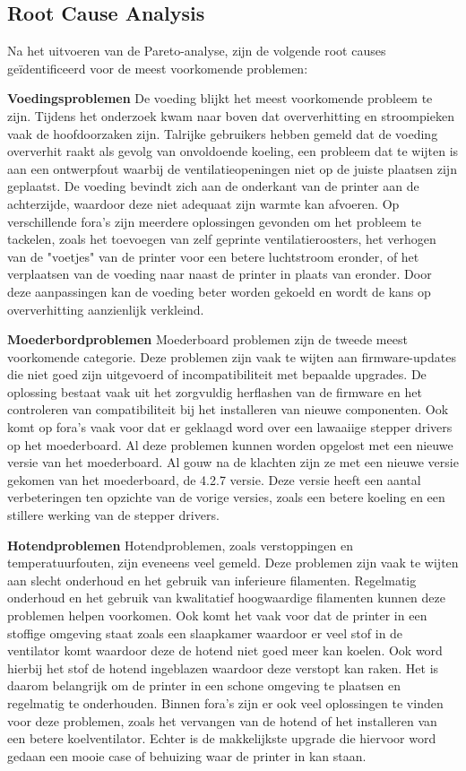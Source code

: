 \documentclass{article}
\begin{document}
\subsection{Root Cause Analysis}
Na het uitvoeren van de Pareto-analyse, zijn de volgende root causes geïdentificeerd voor de meest voorkomende problemen:

\textbf{Voedingsproblemen}
De voeding blijkt het meest voorkomende probleem te zijn. Tijdens het onderzoek kwam naar boven dat oververhitting en stroompieken vaak de hoofdoorzaken zijn. Talrijke gebruikers hebben gemeld dat de voeding oververhit raakt als gevolg van onvoldoende koeling, een probleem dat te wijten is aan een ontwerpfout waarbij de ventilatieopeningen niet op de juiste plaatsen zijn geplaatst. De voeding bevindt zich aan de onderkant van de printer aan de achterzijde, waardoor deze niet adequaat zijn warmte kan afvoeren. Op verschillende fora's zijn meerdere oplossingen gevonden om het probleem te tackelen, zoals het toevoegen van zelf geprinte ventilatieroosters, het verhogen van de "voetjes" van de printer voor een betere luchtstroom eronder, of het verplaatsen van de voeding naar naast de printer in plaats van eronder. Door deze aanpassingen kan de voeding beter worden gekoeld en wordt de kans op oververhitting aanzienlijk verkleind.

\textbf{Moederbordproblemen}
Moederboard problemen zijn de tweede meest voorkomende categorie. Deze problemen zijn vaak te wijten aan firmware-updates die niet goed zijn uitgevoerd of incompatibiliteit met bepaalde upgrades. De oplossing bestaat vaak uit het zorgvuldig herflashen van de firmware en het controleren van compatibiliteit bij het installeren van nieuwe componenten. Ook komt op fora's vaak voor dat er geklaagd word over een lawaaiige stepper drivers op het moederboard. Al deze problemen kunnen worden opgelost met een nieuwe versie van het moederboard. Al gouw na de klachten zijn ze met een nieuwe versie gekomen van het moederboard, de 4.2.7 versie. Deze versie heeft een aantal verbeteringen ten opzichte van de vorige versies, zoals een betere koeling en een stillere werking van de stepper drivers.

\textbf{Hotendproblemen}
Hotendproblemen, zoals verstoppingen en temperatuurfouten, zijn eveneens veel gemeld. Deze problemen zijn vaak te wijten aan slecht onderhoud en het gebruik van inferieure filamenten. Regelmatig onderhoud en het gebruik van kwalitatief hoogwaardige filamenten kunnen deze problemen helpen voorkomen. Ook komt het vaak voor dat de printer in een stoffige omgeving staat zoals een slaapkamer waardoor er veel stof in de ventilator komt waardoor deze de hotend niet goed meer kan koelen. Ook word hierbij het stof de hotend ingeblazen waardoor deze verstopt kan raken. Het is daarom belangrijk om de printer in een schone omgeving te plaatsen en regelmatig te onderhouden. Binnen fora's zijn er ook veel oplossingen te vinden voor deze problemen, zoals het vervangen van de hotend of het installeren van een betere koelventilator. Echter is de makkelijkste upgrade die hiervoor word gedaan een mooie case of behuizing waar de printer in kan staan.
\end{document}
